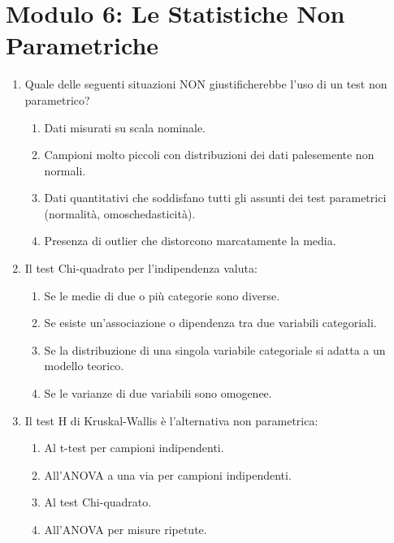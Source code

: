 \documentclass[12pt, a4paper]{article}
\begin{document}
\section*{Modulo 6: Le Statistiche Non Parametriche}
\begin{enumerate}[resume]
    \item Quale delle seguenti situazioni NON giustificherebbe l'uso di un test non parametrico?
    \begin{enumerate}
        \item Dati misurati su scala nominale.
        \item Campioni molto piccoli con distribuzioni dei dati palesemente non normali.
        \item Dati quantitativi che soddisfano tutti gli assunti dei test parametrici (normalità, omoschedasticità).
        \item Presenza di outlier che distorcono marcatamente la media.
    \end{enumerate}
    \vspace{0.3cm}

    \item Il test Chi-quadrato per l'indipendenza valuta:
    \begin{enumerate}
        \item Se le medie di due o più categorie sono diverse.
        \item Se esiste un'associazione o dipendenza tra due variabili categoriali.
        \item Se la distribuzione di una singola variabile categoriale si adatta a un modello teorico.
        \item Se le varianze di due variabili sono omogenee.
    \end{enumerate}
    \vspace{0.3cm}

    \item Il test H di Kruskal-Wallis è l'alternativa non parametrica:
    \begin{enumerate}
        \item Al t-test per campioni indipendenti.
        \item All'ANOVA a una via per campioni indipendenti.
        \item Al test Chi-quadrato.
        \item All'ANOVA per misure ripetute.
    \end{enumerate}
    \vspace{0.3cm}


\end{enumerate}
\end{document}
